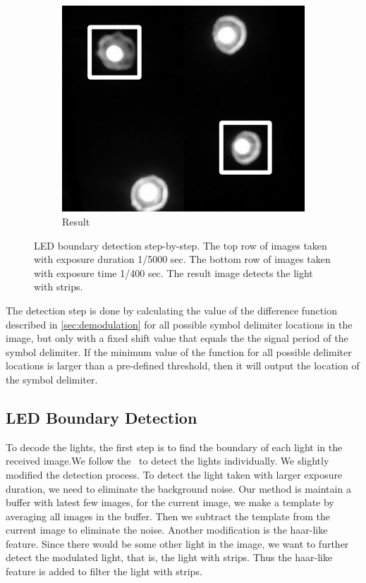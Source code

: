 \begin{figure}[!t]
\begin{subfigure}[h]{0.16\textwidth}
      \includegraphics[width=\textwidth]{pic/bbox/bbox_H_stripedLED400_crop.png}
      \caption{Result} \label{fig:bbox_result}
   \end{subfigure}%
   \caption{LED boundary detection step-by-step. The top row of images taken with exposure duration 1/5000 sec. The bottom row of images taken with exposure time 1/400 sec. The result image detects the light with strips.}
   \label{fig:bbox}
\end{figure}

The detection step is done by calculating the value of the difference function described in \autoref{sec:demodulation} for all possible symbol delimiter locations in the image, but only with a fixed shift value that equals the the signal period of the symbol delimiter. If the minimum value of the function for all possible delimiter locations is larger than a pre-defined threshold, then it will output the location of the symbol delimiter.

\subsection{LED Boundary Detection}
To decode the lights, the first step is to find the boundary of each light in the received image.We follow the~\cite{luxapose} to detect the lights individually. We slightly modified the detection process. To detect the light taken with larger exposure duration, we need to eliminate the background noise. Our method is maintain a buffer with latest few images, for the current image, we make a template by averaging all images in the buffer. Then we subtract the template from the current image to eliminate the noise. Another modification is the haar-like feature. Since there would be some other light in the image, we want to further detect the modulated light, that is, the light with strips. Thus the haar-like feature is added to filter the light with strips.

